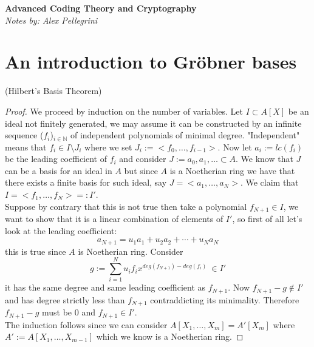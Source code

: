 \documentclass[11pt,a4paper]{report}
\theoremstyle{plain}
\theoremstyle{definition}
\begin{document}
\begin{titlepage}
   \begin{center}
      \Huge\textbf{Advanced Coding Theory and Cryptography}\\
      \bigskip
      \LARGE\textit{Notes by: Alex Pellegrini}
   \end{center}
\end{titlepage}


\tableofcontents
\chapter{An introduction to Gr\"obner bases}

\begin{thm-hand}[2.1.10]
	(Hilbert's Basis Theorem)
\end{thm-hand}
\begin{proof}
		We proceed by induction on the number of variables.
		Let $I \subset A[X]$ be an ideal not finitely generated, we may assume it can be constructed by an infinite sequence ($f_i$)$_{i\in \mathbb{N}}$ of  independent polynomials of minimal degree. "Independent" means that $f_i \in I \setminus J_i$ where we set $J_i := <f_0, \ldots, f_{i-1}>$. Now let $a_i := lc(f_i)$ be the leading coefficient of $f_i$ and consider $J := {a_0, a_1, \ldots} \subset A$. We know that $J$ can be a basis for an ideal in $A$ but since $A$ is a Noetherian ring we have that there exists a finite basis for such ideal, say $J = <a_1, \ldots, a_N>$. We claim that $I = <f_1,\ldots,f_N> =: I'$.\\
		Suppose by contrary that this is not true then take a polynomial $f_{N+1} \in I$, we want to show that it is a linear combination of elements of $I'$, so first of all let's look at the leading coefficient:
		\[
			a_{N+1} = u_1a_1 + u_2a_2 + \cdots + u_Na_N 		
		\]
		this is true since $A$ is Noetherian ring. Consider 
		\[
			g := \sum\limits_{i=1}^Nu_if_ix^{deg(f_{N+1}) - deg(f_i)}\ \in I'
		\]
		it has the same degree and same leading coefficient as $f_{N+1}$.
		Now $f_{N+1} - g \notin I'$ and has degree strictly less than $f_{N+1}$ contraddicting its minimality. Therefore $f_{N+1} - g$ must be $0$ and $f_{N+1} \in I'$.\\
		
		The induction follows since we can consider $A[X_1,\ldots,X_m] = A'[X_m]$ where $A' := A[X_1,\ldots,X_{m-1}]$ which we know is a Noetherian ring.
\end{proof}
\end{document}
